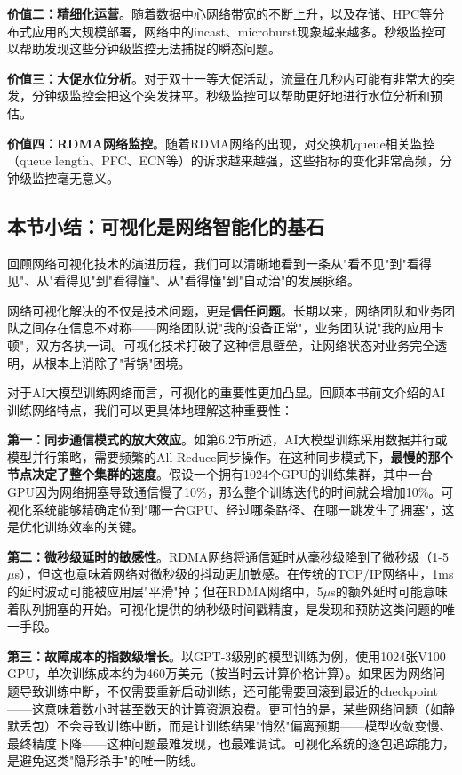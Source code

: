 \textbf{价值二：精细化运营}。随着数据中心网络带宽的不断上升，以及存储、HPC等分布式应用的大规模部署，网络中的incast、microburst现象越来越多。秒级监控可以帮助发现这些分钟级监控无法捕捉的瞬态问题。

\textbf{价值三：大促水位分析}。对于双十一等大促活动，流量在几秒内可能有非常大的突发，分钟级监控会把这个突发抹平。秒级监控可以帮助更好地进行水位分析和预估。

\textbf{价值四：RDMA网络监控}。随着RDMA网络的出现，对交换机queue相关监控（queue length、PFC、ECN等）的诉求越来越强，这些指标的变化非常高频，分钟级监控毫无意义。

\subsection{本节小结：可视化是网络智能化的基石}

回顾网络可视化技术的演进历程，我们可以清晰地看到一条从"看不见"到"看得见"、从"看得见"到"看得懂"、从"看得懂"到"自动治"的发展脉络。

网络可视化解决的不仅是技术问题，更是\textbf{信任问题}。长期以来，网络团队和业务团队之间存在信息不对称——网络团队说"我的设备正常"，业务团队说"我的应用卡顿"，双方各执一词。可视化技术打破了这种信息壁垒，让网络状态对业务完全透明，从根本上消除了"背锅"困境。

对于AI大模型训练网络而言，可视化的重要性更加凸显。回顾本书前文介绍的AI训练网络特点，我们可以更具体地理解这种重要性：

\textbf{第一：同步通信模式的放大效应}。如第6.2节所述，AI大模型训练采用数据并行或模型并行策略，需要频繁的All-Reduce同步操作。在这种同步模式下，\textbf{最慢的那个节点决定了整个集群的速度}。假设一个拥有1024个GPU的训练集群，其中一台GPU因为网络拥塞导致通信慢了10\%，那么整个训练迭代的时间就会增加10\%。可视化系统能够精确定位到"哪一台GPU、经过哪条路径、在哪一跳发生了拥塞"，这是优化训练效率的关键。

\textbf{第二：微秒级延时的敏感性}。RDMA网络将通信延时从毫秒级降到了微秒级（1-5$\mu$s），但这也意味着网络对微秒级的抖动更加敏感。在传统的TCP/IP网络中，1ms的延时波动可能被应用层"平滑"掉；但在RDMA网络中，5$\mu$s的额外延时可能意味着队列拥塞的开始。可视化提供的纳秒级时间戳精度，是发现和预防这类问题的唯一手段。

\textbf{第三：故障成本的指数级增长}。以GPT-3级别的模型训练为例，使用1024张V100 GPU，单次训练成本约为460万美元（按当时云计算价格计算）。如果因为网络问题导致训练中断，不仅需要重新启动训练，还可能需要回滚到最近的checkpoint——这意味着数小时甚至数天的计算资源浪费。更可怕的是，某些网络问题（如静默丢包）不会导致训练中断，而是让训练结果"悄然"偏离预期——模型收敛变慢、最终精度下降——这种问题最难发现，也最难调试。可视化系统的逐包追踪能力，是避免这类"隐形杀手"的唯一防线。

